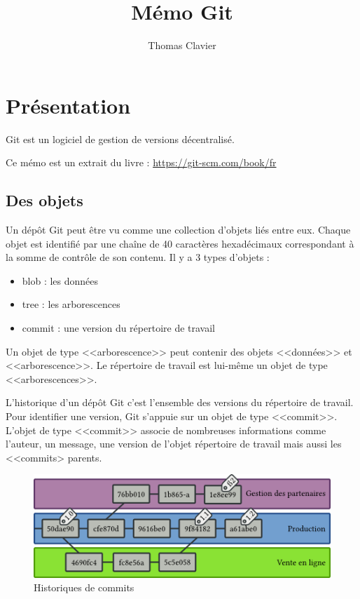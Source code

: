 \documentclass[a4paper]{article}
\title{Mémo Git}
\author{Thomas Clavier}
\date{}
\begin{document}
\maketitle

\section*{Présentation}

Git est un logiciel de gestion de versions décentralisé.

Ce mémo est un extrait du livre : \url{https://git-scm.com/book/fr}

\subsection*{Des objets}
Un dépôt Git peut être vu comme une collection d’objets liés entre eux. 
Chaque objet est identifié par une chaîne de 40 caractères hexadécimaux
correspondant à la somme de contrôle de son contenu. 
Il y a 3 types d'objets : 
\begin{itemize}
\item blob : les données
\item tree : les arborescences
\item commit : une version du répertoire de travail
\end{itemize}
Un objet de type <<arborescence>> peut contenir des objets <<données>> et <<arborescence>>.
Le répertoire de travail est lui-même un objet de type <<arborescences>>. 

L'historique d'un dépôt Git c'est l'ensemble des versions du répertoire de travail. Pour identifier une version, Git s'appuie sur un objet de type <<commit>>. 
L'objet de type <<commit>> associe de nombreuses informations comme l'auteur, un message, une version de l'objet répertoire de travail mais aussi les <<commits> parents.

\begin{figure}[h]
  \center
  \includegraphics{graphs}
  \caption{Historiques de commits}
\end{figure}
\end{document}
